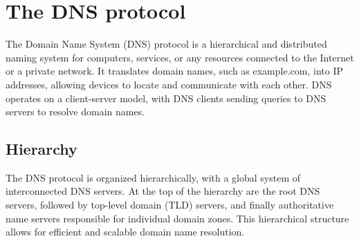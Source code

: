 \section{The DNS protocol}
The Domain Name System (DNS) protocol is a hierarchical and distributed naming system for computers, services, or any resources connected to the Internet or a private network. It translates domain names, such as example.com, into IP addresses, allowing devices to locate and communicate with each other. DNS operates on a client-server model, with DNS clients sending queries to DNS servers to resolve domain names.

\subsection*{Hierarchy}
The DNS protocol is organized hierarchically, with a global system of interconnected DNS servers. At the top of the hierarchy are the root DNS servers, followed by top-level domain (TLD) servers, and finally authoritative name servers responsible for individual domain zones. This hierarchical structure allows for efficient and scalable domain name resolution.

